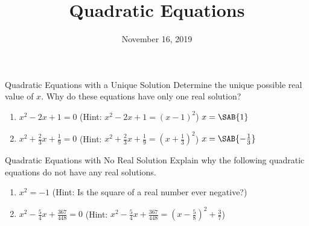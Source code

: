 \documentclass[12pt,letterpaper]{article}
\title{Quadratic Equations}
\date{November 16, 2019}
\begin{document}
\maketitle

\thispagestyle{empty}


\begin{problem}{Quadratic Equations with a Unique Solution}
  Determine the unique possible real value of \(x\). Why do these equations have only one
  real solution?

  \begin{enumerate}[\hspace{.5cm}a.]
    \item \( x^2 - 2x + 1 = 0 \)
    (Hint: $x^2 - 2x + 1 = (x-1)^2$)
    \hfill \(x = \SAB{1}\)
    \item \( x^2 + \frac{2}{3}x + \frac{1}{9} = 0 \)
    (Hint: $x^2 + \frac{2}{3}x + \frac{1}{9} = \left(x+\frac{1}{3}\right)^2$)
    \hfill \(x = \SAB{-\frac{1}{3}}\)
  \end{enumerate}
\end{problem}

\begin{problem}{Quadratic Equations with No Real Solution}
  Explain why the following quadratic equations do not have any real solutions.

  \begin{enumerate}[\hspace{.5cm}a.]
    \item \( x^2 = -1 \)
    (Hint: Is the square of a real number ever negative?)
    \item \( x^2 - \frac{5}{4}x + \frac{367}{448} = 0 \)
    (Hint: $x^2 - \frac{5}{4}x + \frac{367}{448} = {\left(x-\frac{5}{8}\right)}^2 +
    \frac{3}{7}$)
  \end{enumerate}
\end{problem}
\end{document}
